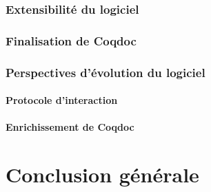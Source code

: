 \documentclass[a4paper, 11pt]{report}
\begin{document}
    \subsection{Extensibilité du logiciel}
    \subsection{Finalisation de Coqdoc}
    \subsection{Perspectives d'évolution du logiciel}
    \subsubsection{Protocole d'interaction}
    \subsubsection{Enrichissement de Coqdoc}
\chapter{Conclusion générale}

\end{document}
